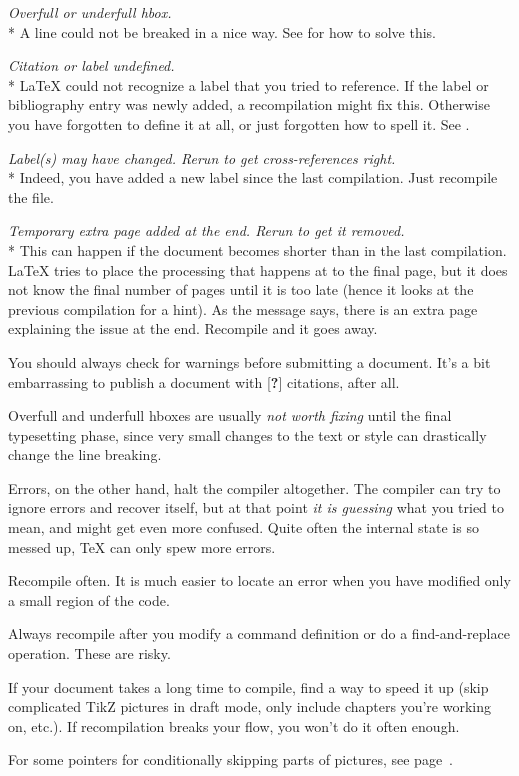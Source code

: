 \medskip\noindent\emph{Overfull or underfull hbox.}\\*
A line could not be breaked in a nice way.
See  for how to solve this.

\medskip\noindent\emph{Citation or label undefined.}\\*
\LaTeX{} could not recognize a label that you tried to reference.
If the label or bibliography entry was newly added, a recompilation might fix this.
Otherwise you have forgotten to define it at all, or just forgotten how to spell it.
See .

\medskip\noindent\emph{Label(s) may have changed. Rerun to get cross-references right.}\\*
Indeed, you have added a new label since the last compilation.
Just recompile the file.

\medskip\noindent\emph{Temporary extra page added at the end. Rerun to get it removed.}\\*
This can happen if the document becomes shorter than in the last compilation.
\LaTeX{} tries to place the processing that happens at \verb||
to the final page, but it does not know the final number of pages until it is too late
(hence it looks at the previous compilation for a hint).
As the message says, there is an extra page explaining the issue at the end.
Recompile and it goes away.


\begin{practices}
You should always check for warnings before submitting a document.
It's a bit embarrassing to publish a document with [\textbf{?}] citations, after all.

Overfull and underfull hboxes are usually \emph{not worth fixing}
until the final typesetting phase,
since very small changes to the text or style can drastically change the line breaking.
\end{practices}


Errors, on the other hand, halt the compiler altogether.
The compiler can try to ignore errors and recover itself,
but at that point \emph{it is guessing} what you tried to mean,
and might get even more confused.
Quite often the internal state is so messed up, \TeX{} can only spew more errors.


\begin{practices}
Recompile often.
It is much easier to locate an error when you have modified only a small region of the code.

Always recompile after you modify a command definition
or do a find-and-replace operation.
These are risky.

If your document takes a long time to compile,
find a way to speed it up
(skip complicated TikZ pictures in draft mode, only include chapters you're working on, etc.).
If recompilation breaks your flow, you won't do it often enough.

For some pointers for conditionally skipping parts of pictures, see page~\pageref{ex:booleans}.
\end{practices}


